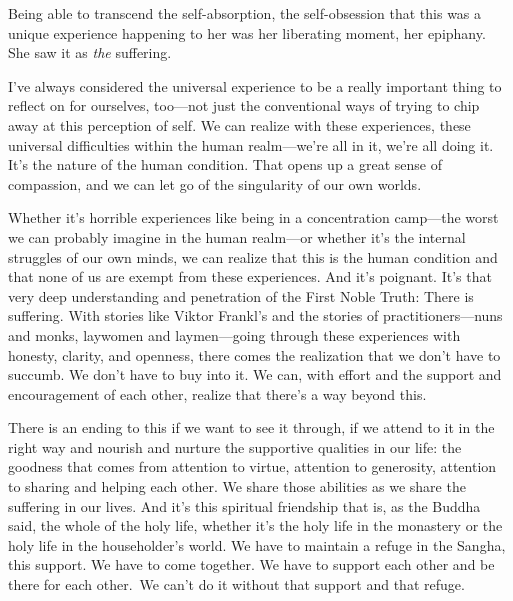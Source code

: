 Being able to transcend the self-absorption, the self-obsession that this was a unique experience happening to her was her liberating moment, her epiphany. She saw it \linebreak as \emph{the} suffering.

I've always considered the universal experience to be a really important thing to reflect on for ourselves, too---not just the conventional ways of trying to chip away at this perception of self. We can realize with these experiences, these universal difficulties within the human realm---we're all in it, we're all doing it. It's the nature of the human condition. That opens up a great sense of compassion, and we can let go of the singularity of our own worlds.

Whether it's horrible experiences like being in a concentration camp---the worst we can probably imagine in the human realm---or whether it's the internal struggles of our own minds, we can realize that this is the human condition and that none of us are exempt from these experiences. And it's poignant. It's that very deep understanding and penetration of the First Noble Truth: There is suffering. With stories like Viktor Frankl's and the stories of practitioners---nuns and monks, laywomen and laymen---going through these experiences with honesty, clarity, and openness, there comes the realization that we don't have to succumb. We don't have to buy into it. We can, with effort and the support and encouragement of each other, realize that there's a \linebreak way beyond this.

There is an ending to this if we want to see it through, if we attend to it in the right way and nourish and nurture the supportive qualities in our life: the goodness that comes from attention to virtue, attention to generosity, attention to sharing and helping each other. We share those abilities as we share the suffering in our lives. And it's this spiritual friendship that is, as the Buddha said, the whole of the holy \linebreak life, whether it's the holy life in the monastery or the \linebreak holy life in the householder's world. We have to maintain a refuge in the Sangha, this support. We have to come together. We have to support each other and be there for each \mbox{other. We} can't do it without that support and that refuge.{\parfillskip=0pt \par}

